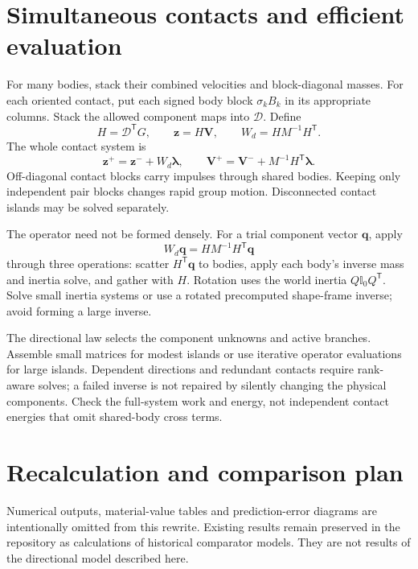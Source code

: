 \documentclass[11pt,a4paper]{article}
\newcommand{\inertia}{\mathbb I}
\begin{document}
\section{Simultaneous contacts and efficient evaluation}
For many bodies, stack their combined velocities and block-diagonal masses. For each oriented contact, put each signed body block $\sigma_k B_k$ in its appropriate columns. Stack the allowed component maps into $\mathcal D$. Define
\begin{equation}
H=\mathcal D^{\mathsf T}G,\qquad
\mathbf{z}=H\mathbf{V},\qquad
W_d=HM^{-1}H^{\mathsf T}.
\end{equation}
The whole contact system is
\begin{equation}
\mathbf{z}^+=\mathbf{z}^-+W_d\boldsymbol{\lambda},\qquad
\mathbf{V}^+=\mathbf{V}^-+M^{-1}H^{\mathsf T}\boldsymbol{\lambda}.
\end{equation}
Off-diagonal contact blocks carry impulses through shared bodies. Keeping only independent pair blocks changes rapid group motion. Disconnected contact islands may be solved separately.

The operator need not be formed densely. For a trial component vector $\mathbf{q}$, apply
\begin{equation}
\boxed{W_d \mathbf{q}=HM^{-1}H^{\mathsf T}\mathbf{q}}
\end{equation}
through three operations: scatter $H^{\mathsf T}\mathbf{q}$ to bodies, apply each body's inverse mass and inertia solve, and gather with $H$. Rotation uses the world inertia $Q\inertia_0Q^{\mathsf T}$. Solve small inertia systems or use a rotated precomputed shape-frame inverse; avoid forming a large inverse.

The directional law selects the component unknowns and active branches. Assemble small matrices for modest islands or use iterative operator evaluations for large islands. Dependent directions and redundant contacts require rank-aware solves; a failed inverse is not repaired by silently changing the physical components. Check the full-system work and energy, not independent contact energies that omit shared-body cross terms.

\section{Recalculation and comparison plan}
Numerical outputs, material-value tables and prediction-error diagrams are intentionally omitted from this rewrite. Existing results remain preserved in the repository as calculations of historical comparator models. They are not results of the directional model described here.
\end{document}
